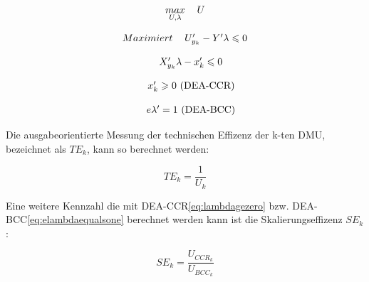 \begin{equation}\label{eq:maxu}
	\begin{tabular}{rr}
		$\underset{U,\lambda}{max}$ & $U$	 	
	\end{tabular}
\end{equation}

\begin{equation}\label{eq:uy}
	\begin{tabular}{rr}
		$Maximiert$ & $U_{y_k}' - Y'\lambda \leqslant 0$	 	
	\end{tabular}
\end{equation}


\begin{equation}\label{eq:xylambda}
	\begin{tabular}{rr}
		$$ & $X_{y_k}'\lambda - x_k' \leqslant 0$	 	
	\end{tabular}
\end{equation}

\begin{equation}\label{eq:lambdagezero}
	\begin{tabular}{rr}
		$$ & $x_k' \geqslant 0$ (DEA-CCR)	 	
	\end{tabular}
\end{equation}

\begin{equation}\label{eq:elambdaequalsone}
	\begin{tabular}{rr}
		$$ & $e\lambda' = 1$ (DEA-BCC)	 	
	\end{tabular}
\end{equation}

Die ausgabeorientierte Messung der technischen Effizenz der k-ten DMU, bezeichnet als $TE_k$, kann so berechnet werden:

\begin{equation}
	TE_k= \frac{1}{U_k}
\end{equation}

Eine weitere Kennzahl die mit DEA-CCR\eqref{eq:lambdagezero} bzw. DEA-BCC\eqref{eq:elambdaequalsone} berechnet werden kann ist die Skalierungseffizenz $SE_k$:

\begin{equation}
	SE_k = \frac{U_{CCR_k}}{U_{BCC_k}}
\end{equation}

